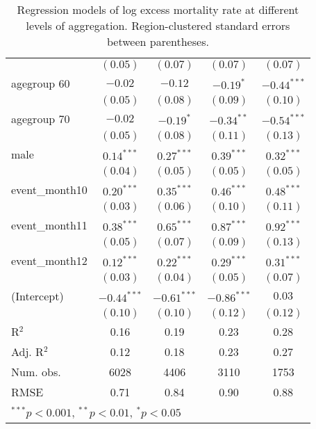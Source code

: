 \begin{table}
\begin{center}
\begin{tabular}{l c c c c }
                     & $(0.05)$      & $(0.07)$      & $(0.07)$      & $(0.07)$      \\
agegroup 60          & $-0.02$       & $-0.12$       & $-0.19^{*}$   & $-0.44^{***}$ \\
                     & $(0.05)$      & $(0.08)$      & $(0.09)$      & $(0.10)$      \\
agegroup 70          & $-0.02$       & $-0.19^{*}$   & $-0.34^{**}$  & $-0.54^{***}$ \\
                     & $(0.05)$      & $(0.08)$      & $(0.11)$      & $(0.13)$      \\
male                 & $0.14^{***}$  & $0.27^{***}$  & $0.39^{***}$  & $0.32^{***}$  \\
                     & $(0.04)$      & $(0.05)$      & $(0.05)$      & $(0.05)$      \\
event\_month10       & $0.20^{***}$  & $0.35^{***}$  & $0.46^{***}$  & $0.48^{***}$  \\
                     & $(0.03)$      & $(0.06)$      & $(0.10)$      & $(0.11)$      \\
event\_month11       & $0.38^{***}$  & $0.65^{***}$  & $0.87^{***}$  & $0.92^{***}$  \\
                     & $(0.05)$      & $(0.07)$      & $(0.09)$      & $(0.13)$      \\
event\_month12       & $0.12^{***}$  & $0.22^{***}$  & $0.29^{***}$  & $0.31^{***}$  \\
                     & $(0.03)$      & $(0.04)$      & $(0.05)$      & $(0.07)$      \\
(Intercept)          & $-0.44^{***}$ & $-0.61^{***}$ & $-0.86^{***}$ & $0.03$        \\
                     & $(0.10)$      & $(0.10)$      & $(0.12)$      & $(0.12)$      \\
\hline
R$^2$                & 0.16          & 0.19          & 0.23          & 0.28          \\
Adj. R$^2$           & 0.12          & 0.18          & 0.23          & 0.27          \\
Num. obs.            & 6028          & 4406          & 3110          & 1753          \\
RMSE                 & 0.71          & 0.84          & 0.90          & 0.88          \\
\hline
\multicolumn{5}{l}{\scriptsize{$^{***}p<0.001$, $^{**}p<0.01$, $^*p<0.05$}}
\end{tabular}
\caption{Regression models of log excess mortality rate at different levels of aggregation. Region-clustered standard errors between parentheses.}
\label{tab:regionmodels}
\end{center}
\end{table}
